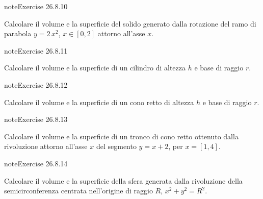 \documentclass[letterpaper,10pt,italian]{jupyterBook}
\begin{document}
\begin{sphinxadmonition}{note}{Exercise 26.8.10}





\sphinxAtStartPar
Calcolare il volume e la superficie del solido generato dalla rotazione del ramo di parabola \(y = 2\, x^2\), \(x \in [0,2]\) attorno all’asse \(x\).
\end{sphinxadmonition}
 \label{exercise:ch/infinitesimal_calculus/integrals-problems-exercise-10}

\begin{sphinxadmonition}{note}{Exercise 26.8.11}





\sphinxAtStartPar
Calcolare il volume e la superficie di un cilindro di altezza \(h\) e base di raggio \(r\).
\end{sphinxadmonition}
 \label{exercise:ch/infinitesimal_calculus/integrals-problems-exercise-11}

\begin{sphinxadmonition}{note}{Exercise 26.8.12}





\sphinxAtStartPar
Calcolare il volume e la superficie di un cono retto di altezza \(h\) e base di raggio \(r\).
\end{sphinxadmonition}
 \label{exercise:ch/infinitesimal_calculus/integrals-problems-exercise-12}

\begin{sphinxadmonition}{note}{Exercise 26.8.13}





\sphinxAtStartPar
Calcolare il volume e la superficie di un tronco di cono retto ottenuto dalla rivoluzione attorno all’asse \(x\) del segmento \(y = x + 2\), per \(x = [1,4]\).
\end{sphinxadmonition}
 \label{exercise:ch/infinitesimal_calculus/integrals-problems-exercise-13}

\begin{sphinxadmonition}{note}{Exercise 26.8.14}





\sphinxAtStartPar
Calcolare il volume e la superficie della sfera generata dalla rivoluzione della semicirconferenza centrata nell’origine di raggio \(R\), \(x^2 + y^2 = R^2\).
\end{sphinxadmonition}
 \label{exercise:ch/infinitesimal_calculus/integrals-problems-exercise-14}
\end{document}
